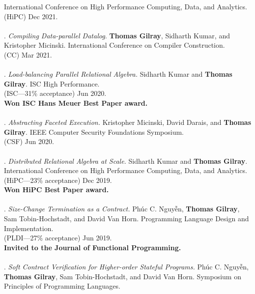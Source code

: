 International Conference on High Performance Computing, Data, and Analytics.
\\(HiPC) Dec 2021. 
\\ \vspace{-0.1cm}\\
\paper. \textit{Compiling Data-parallel Datalog.}
\textbf{Thomas Gilray}, Sidharth Kumar, and Kristopher Micinski.
International Conference on Compiler Construction.
\\(CC) Mar 2021. 
\\ \vspace{-0.1cm}\\
\paper. \textit{Load-balancing Parallel Relational Algebra.}
Sidharth Kumar and \textbf{Thomas Gilray}.
ISC High Performance.
\\(ISC---31\% acceptance) Jun 2020. 
\\\textbf{Won ISC Hans Meuer Best Paper award.} \\ \vspace{-0.1cm}\\
\paper. \textit{Abstracting Faceted Execution.}
Kristopher Micinski, David Darais, and \textbf{Thomas Gilray}.
IEEE Computer Security Foundations Symposium.
\\(CSF) Jun 2020. 
\\ \vspace{-0.1cm}\\
\paper. \textit{Distributed Relational Algebra at Scale.}
Sidharth Kumar and \textbf{Thomas Gilray}.
International Conference on High Performance Computing, Data, and Analytics.
\\(HiPC---23\% acceptance) Dec 2019. 
\\\textbf{Won HiPC Best Paper award.} \\ \vspace{-0.1cm}\\
\paper. \textit{Size-Change Termination as a Contract.}
Phúc C. Nguyễn, \textbf{Thomas Gilray}, Sam Tobin-Hochstadt, and David Van Horn.
Programming Language Design and Implementation.
\\(PLDI---27\% acceptance) Jun 2019. 
\\\textbf{Invited to the Journal of Functional Programming.} \\ \vspace{-0.1cm}\\
\paper. \textit{Soft Contract Verification for Higher-order Stateful Programs.}
Phúc C. Nguyễn, \textbf{Thomas Gilray}, Sam Tobin-Hochstadt, and David Van Horn.
Symposium on Principles of Programming Languages.
